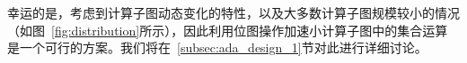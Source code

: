 幸运的是，考虑到计算子图动态变化的特性，以及大多数计算子图规模较小的情况（如图~\ref{fig:distribution}所示），因此利用位图操作加速小计算子图中的集合运算是一个可行的方案。我们将在~\ref{subsec:ada_design_1}节对此进行详细讨论。











